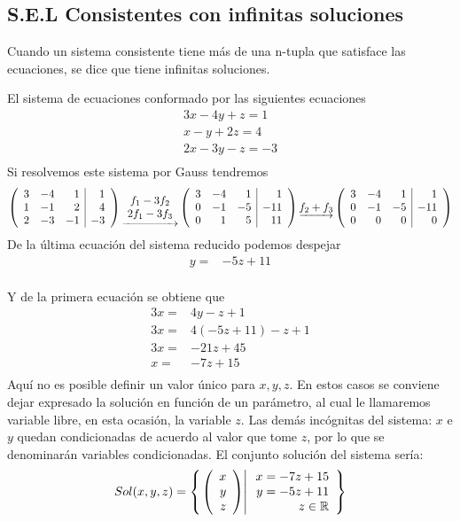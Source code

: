 \subsection{S.E.L Consistentes con infinitas soluciones}
Cuando un sistema consistente tiene más de una n-tupla que satisface las ecuaciones, se dice que tiene infinitas soluciones.

\begin{ejemplo}
El sistema de ecuaciones conformado por las siguientes ecuaciones 
\begin{align*}
3x-4y+z=1\\
x-y+2z=4\\
2x-3y-z=-3\\
\end{align*}
Si resolvemos este sistema por Gauss tendremos
\begin{align*}
\reducir{rrr|r}{
3&-4&1&1\\
1&-1&2&4\\
2&-3&-1&-3\\
}
\underrightarrow{\begin{array}{c}
    f_1 - 3f_2\\
    2f_1 - 3f_3
\end{array}}
\reducir{rrr|r}{
3&-4&1&1\\
0&-1&-5&-11\\
0&1&5&11\\
}
\underrightarrow{f_2 + f_3}
\reducir{rrr|r}{
3&-4&1&1\\
0&-1&-5&-11\\
0&0&0&0\\
}
\end{align*}
De la última ecuación del sistema reducido podemos despejar 
\begin{align*}
y=&-5z+11\\
\end{align*}

Y de la primera ecuación se obtiene que
\begin{align*}
3x=&4y-z+1\\
3x=&4(-5z+11)-z+1\\
3x=&-21z+45\\
x=&-7z+15\\
\end{align*}
Aquí no es posible definir un valor único para $x, y, z$. En estos casos se conviene dejar expresado la solución en función de un parámetro, al cual le llamaremos variable libre, en esta ocasión, la variable $z$. Las demás incógnitas del sistema: $x$ e $y$ quedan condicionadas de acuerdo al valor que tome $z$, por lo que se denominarán variables condicionadas. El conjunto solución del sistema sería:
\begin{align*}
Sol(x,y, z)=\llaves{\vectrtres{x}{y}{z}}{\begin{array}{r}x=-7z+15\\y=-5z+11\\z\in \dobler
\end{array}}
\end{align*}

\end{ejemplo}

